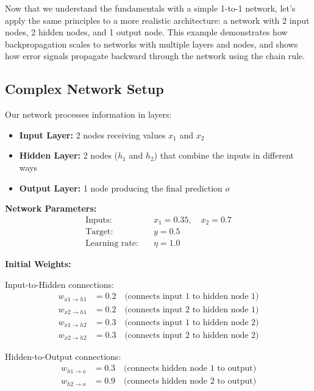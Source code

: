 \documentclass[12pt]{article}
\begin{document}
Now that we understand the fundamentals with a simple 1-to-1 network, let's apply the same principles to a more realistic architecture: a network with 2 input nodes, 2 hidden nodes, and 1 output node. This example demonstrates how backpropagation scales to networks with multiple layers and nodes, and shows how error signals propagate backward through the network using the chain rule.

\subsection*{Complex Network Setup}

Our network processes information in layers:
\begin{itemize}
    \item \textbf{Input Layer:} 2 nodes receiving values $x_1$ and $x_2$
    \item \textbf{Hidden Layer:} 2 nodes ($h_1$ and $h_2$) that combine the inputs in different ways
    \item \textbf{Output Layer:} 1 node producing the final prediction $o$
\end{itemize}

\noindent\textbf{Network Parameters:}
\begin{align*}
\text{Inputs:} \quad &x_1 = 0.35, \quad x_2 = 0.7 \\
\text{Target:} \quad &y = 0.5 \\
\text{Learning rate:} \quad &\eta = 1.0
\end{align*}

\noindent\textbf{Initial Weights:}

Input-to-Hidden connections:
\begin{align*}
w_{x1 \to h1} &= 0.2 \quad \text{(connects input 1 to hidden node 1)} \\
w_{x2 \to h1} &= 0.2 \quad \text{(connects input 2 to hidden node 1)} \\
w_{x1 \to h2} &= 0.3 \quad \text{(connects input 1 to hidden node 2)} \\
w_{x2 \to h2} &= 0.3 \quad \text{(connects input 2 to hidden node 2)}
\end{align*}

Hidden-to-Output connections:
\begin{align*}
w_{h1 \to o} &= 0.3 \quad \text{(connects hidden node 1 to output)} \\
w_{h2 \to o} &= 0.9 \quad \text{(connects hidden node 2 to output)}
\end{align*}
\end{document}
